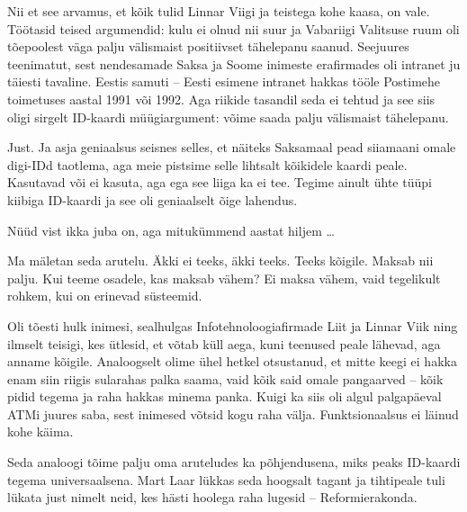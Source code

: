 Nii et see arvamus, et kõik tulid Linnar 
Viigi ja teistega kohe kaasa, on vale. Töötasid teised argumendid: kulu ei olnud nii suur ja 
Vabariigi Valitsuse ruum oli tõepoolest väga palju välismaist positiivset tähelepanu 
saanud. Seejuures teenimatut, sest nendesamade Saksa ja Soome inimeste erafirmades oli intranet ju täiesti tavaline. 
Eestis samuti -- Eesti esimene intranet hakkas tööle Postimehe toimetuses aastal 1991 või 1992. Aga riikide tasandil seda ei tehtud ja see siis oligi sirgelt ID-kaardi müügiargument: 
võime saada palju välismaist tähelepanu.


Just. Ja asja geniaalsus seisnes selles, et näiteks Saksamaal pead 
siiamaani omale digi-IDd taotlema, aga meie pistsime selle 
lihtsalt kõikidele kaardi peale. Kasutavad või ei kasuta, aga ega see liiga ka ei 
tee. Tegime ainult ühte tüüpi kiibiga ID-kaardi ja see oli geniaalselt 
õige lahendus.


Nüüd vist ikka juba on, aga mitukümmend aastat hiljem \ldots


Ma mäletan seda arutelu. Äkki ei teeks, äkki teeks. Teeks 
kõigile. Maksab nii palju. Kui teeme osadele, kas maksab vähem? Ei 
maksa vähem, vaid tegelikult rohkem, kui on erinevad süsteemid. 

Oli tõesti hulk inimesi, sealhulgas Infotehnoloogiafirmade 
Liit ja Linnar 
Viik ning ilmselt teisigi, kes ütlesid, et võtab küll aega, kuni teenused peale 
lähevad, aga anname kõigile. Analoogselt olime ühel hetkel 
otsustanud, et mitte keegi ei hakka enam siin riigis sularahas palka saama, vaid kõik said 
omale pangaarved -- kõik pidid tegema ja raha hakkas minema panka. Kuigi ka siis oli algul palgapäeval ATMi 
juures saba, sest inimesed võtsid kogu raha välja. Funktsionaalsus ei läinud kohe käima. 

Seda analoogi tõime 
palju oma aruteludes ka põhjendusena, miks peaks ID-kaardi tegema 
universaalsena. Mart Laar lükkas seda hoogsalt tagant ja tihtipeale tuli lükata just nimelt neid, kes 
hästi hoolega raha lugesid -- Reformierakonda.

